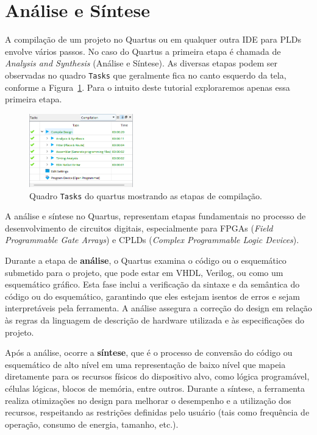 \documentclass[12pt,a4paper]{article}
\begin{document}
\section{Análise e Síntese}

A compilação de um projeto no Quartus ou em qualquer outra IDE para PLDs envolve vários passos. No caso do Quartus a primeira etapa é chamada de \textit{Analysis and Synthesis} (Análise e Síntese). As diversas etapas podem ser observadas no quadro \texttt{Tasks} que geralmente fica no canto esquerdo da tela, conforme a Figura~\ref{fig:23}. Para o intuito deste tutorial exploraremos apenas essa primeira etapa.

\begin{figure}[htbp!]
    \centering
    \includegraphics[width=0.4\textwidth]{./figs/fig23.png}
    \caption{Quadro \texttt{Tasks} do quartus mostrando as etapas de compilação.}
    \label{fig:23}
\end{figure}

A análise e síntese no Quartus, representam etapas fundamentais no processo de desenvolvimento de circuitos digitais, especialmente para FPGAs (\textit{Field Programmable Gate Arrays}) e CPLDs (\textit{Complex Programmable Logic Devices}).

Durante a etapa de \textbf{análise}, o Quartus examina o código ou o esquemático submetido para o projeto, que pode estar em VHDL, Verilog, ou como um esquemático gráfico. Esta fase inclui a verificação da sintaxe e da semântica do código ou do esquemático, garantindo que eles estejam isentos de erros e sejam interpretáveis pela ferramenta. A análise assegura a correção do design em relação às regras da linguagem de descrição de hardware utilizada e às especificações do projeto.

Após a análise, ocorre a \textbf{síntese}, que é o processo de conversão do código ou esquemático de alto nível em uma representação de baixo nível que mapeia diretamente para os recursos físicos do dispositivo alvo, como lógica programável, células lógicas, blocos de memória, entre outros. Durante a síntese, a ferramenta realiza otimizações no design para melhorar o desempenho e a utilização dos recursos, respeitando as restrições definidas pelo usuário (tais como frequência de operação, consumo de energia, tamanho, etc.).
\end{document}

